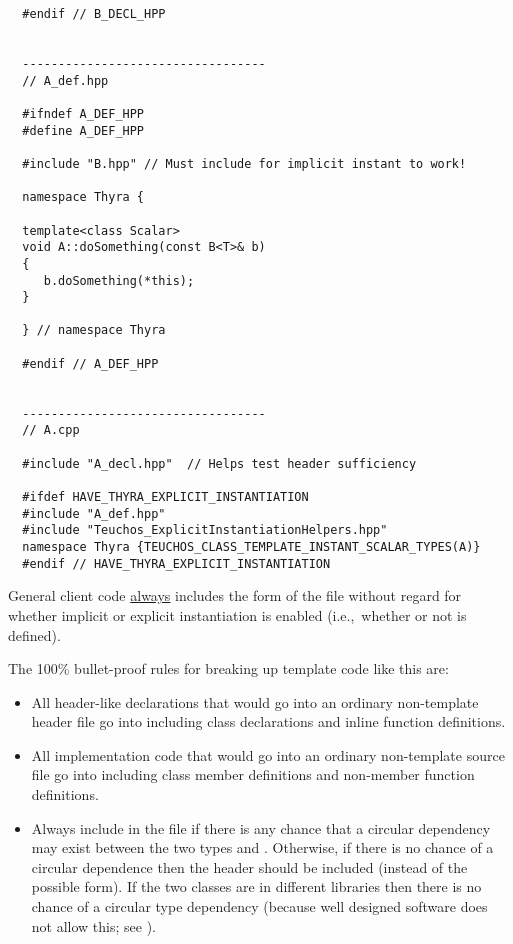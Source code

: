 \begin{itemize}
{\begin{verbatim}
  #endif // B_DECL_HPP


  ----------------------------------
  // A_def.hpp

  #ifndef A_DEF_HPP
  #define A_DEF_HPP

  #include "B.hpp" // Must include for implicit instant to work!

  namespace Thyra {

  template<class Scalar>
  void A::doSomething(const B<T>& b)
  {
     b.doSomething(*this);
  }

  } // namespace Thyra

  #endif // A_DEF_HPP


  ----------------------------------
  // A.cpp

  #include "A_decl.hpp"  // Helps test header sufficiency

  #ifdef HAVE_THYRA_EXPLICIT_INSTANTIATION
  #include "A_def.hpp"
  #include "Teuchos_ExplicitInstantiationHelpers.hpp"
  namespace Thyra {TEUCHOS_CLASS_TEMPLATE_INSTANT_SCALAR_TYPES(A)}
  #endif // HAVE_THYRA_EXPLICIT_INSTANTIATION
\end{verbatim}}


General client code \underline{always} includes the  form
of the file without regard for whether implicit or explicit
instantiation is enabled (i.e.,\ whether or not
 is defined).

The 100\% bullet-proof rules for breaking up template code like this are:

\begin{itemize}

\item All header-like declarations that would go into an ordinary
  non-template  header file go into
   including class declarations and inline
  function definitions.

\item All implementation code that would go into an ordinary
  non-template  source file go into
   including class member definitions and
  non-member function definitions.

\item Always include  in the
   file if there is any chance that a
  circular dependency may exist between the two types
   and .  Otherwise, if there is
  no chance of a circular dependence then the header
   should be included (instead of the
  possible  form).  If the two classes are in
  different libraries then there is no chance of a circular type
  dependency (because well designed software does not allow this; see
  \cite{AgileSoftwareDevelopment}).


\end{itemize}
\end{itemize}
